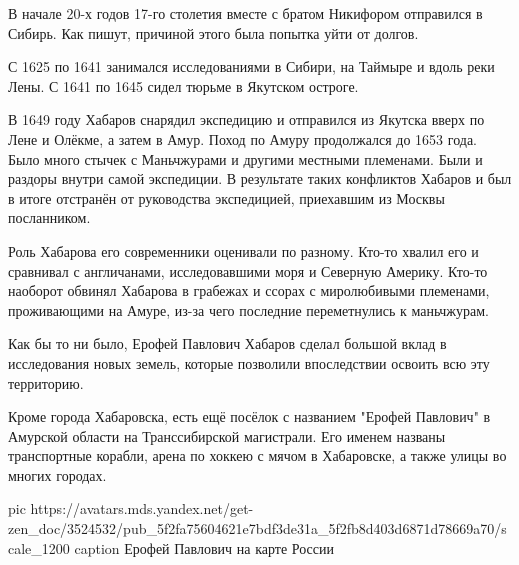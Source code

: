 В начале 20-х годов 17-го столетия вместе с братом Никифором отправился в
Сибирь. Как пишут, причиной этого была попытка уйти от долгов.

С 1625 по 1641 занимался исследованиями в Сибири, на Таймыре и вдоль реки Лены.
С 1641 по 1645 сидел тюрьме в Якутском остроге.

В 1649 году Хабаров снарядил экспедицию и отправился из Якутска вверх по Лене и
Олёкме, а затем в Амур. Поход по Амуру продолжался до 1653 года. Было много
стычек с Маньчжурами и другими местными племенами. Были и раздоры внутри самой
экспедиции. В результате таких конфликтов Хабаров и был в итоге отстранён от
руководства экспедицией, приехавшим из Москвы посланником.

Роль Хабарова его современники оценивали по разному. Кто-то хвалил его и
сравнивал с англичанами, исследовавшими моря и Северную Америку. Кто-то
наоборот обвинял Хабарова в грабежах и ссорах с миролюбивыми племенами,
проживающими на Амуре, из-за чего последние переметнулись к маньчжурам.

Как бы то ни было, Ерофей Павлович Хабаров сделал большой вклад в исследования
новых земель, которые позволили впоследствии освоить всю эту территорию.

Кроме города Хабаровска, есть ещё посёлок с названием "Ерофей Павлович" в
Амурской области на Транссибирской магистрали. Его именем названы транспортные
корабли, арена по хоккею с мячом в Хабаровске, а также улицы во многих городах.

\ifcmt
  pic https://avatars.mds.yandex.net/get-zen_doc/3524532/pub_5f2fa75604621e7bdf3de31a_5f2fb8d403d6871d78669a70/scale_1200
	caption Ерофей Павлович на карте России
\fi

